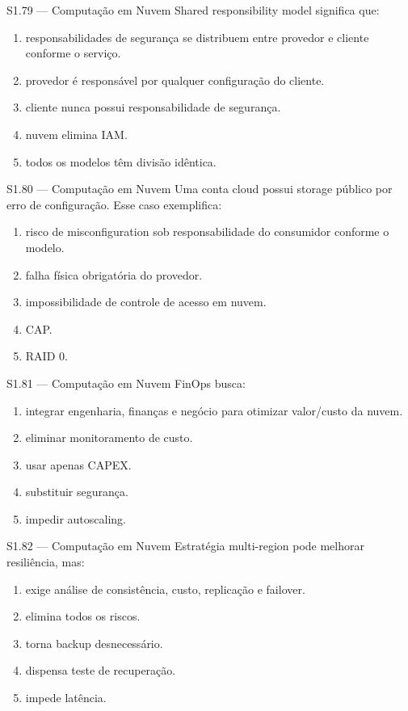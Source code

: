 \begin{questao}{S1.79 — Computação em Nuvem}
Shared responsibility model significa que:
\begin{enumerate}[label=\Alph*)]\item responsabilidades de segurança se distribuem entre provedor e cliente conforme o serviço.\item provedor é responsável por qualquer configuração do cliente.\item cliente nunca possui responsabilidade de segurança.\item nuvem elimina IAM.\item todos os modelos têm divisão idêntica.\end{enumerate}
\end{questao}

\begin{questao}{S1.80 — Computação em Nuvem}
Uma conta cloud possui storage público por erro de configuração. Esse caso exemplifica:
\begin{enumerate}[label=\Alph*)]\item risco de misconfiguration sob responsabilidade do consumidor conforme o modelo.\item falha física obrigatória do provedor.\item impossibilidade de controle de acesso em nuvem.\item CAP.\item RAID 0.\end{enumerate}
\end{questao}

\begin{questao}{S1.81 — Computação em Nuvem}
FinOps busca:
\begin{enumerate}[label=\Alph*)]\item integrar engenharia, finanças e negócio para otimizar valor/custo da nuvem.\item eliminar monitoramento de custo.\item usar apenas CAPEX.\item substituir segurança.\item impedir autoscaling.\end{enumerate}
\end{questao}

\begin{questao}{S1.82 — Computação em Nuvem}
Estratégia multi-region pode melhorar resiliência, mas:
\begin{enumerate}[label=\Alph*)]\item exige análise de consistência, custo, replicação e failover.\item elimina todos os riscos.\item torna backup desnecessário.\item dispensa teste de recuperação.\item impede latência.\end{enumerate}
\end{questao}

